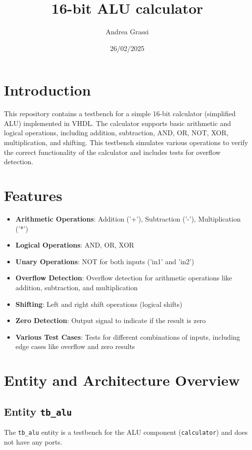 \documentclass{article}
\title{16-bit ALU calculator}
\author{Andrea Grassi}
\date{26/02/2025}
\begin{document}
\maketitle

\section{Introduction}
This repository contains a testbench for a simple 16-bit calculator (simplified ALU) implemented in VHDL. The calculator supports basic arithmetic and logical operations, including addition, subtraction, AND, OR, NOT, XOR, multiplication, and shifting. This testbench simulates various operations to verify the correct functionality of the calculator and includes tests for overflow detection.

\section{Features}
\begin{itemize}
    \item \textbf{Arithmetic Operations}: Addition ('+'), Subtraction ('-'), Multiplication ('*')
    \item \textbf{Logical Operations}: AND, OR, XOR
    \item \textbf{Unary Operations}: NOT for both inputs ('in1' and 'in2')
    \item \textbf{Overflow Detection}: Overflow detection for arithmetic operations like addition, subtraction, and multiplication
    \item \textbf{Shifting}: Left and right shift operations (logical shifts)
    \item \textbf{Zero Detection}: Output signal to indicate if the result is zero
    \item \textbf{Various Test Cases}: Tests for different combinations of inputs, including edge cases like overflow and zero results
\end{itemize}

\section{Entity and Architecture Overview}
\subsection{Entity \texttt{tb\_alu}}
The \texttt{tb\_alu} entity is a testbench for the ALU component (\texttt{calculator}) and does not have any ports.
\end{document}

